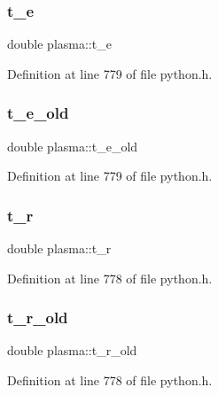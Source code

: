 \subsubsection{\texorpdfstring{t\+\_\+e}{t\_e}}
{\footnotesize\ttfamily double plasma\+::t\+\_\+e}



Definition at line 779 of file python.\+h.

\mbox{\label{structplasma_aefa8d272f5a54cae990359cccd67075d}} 
\subsubsection{\texorpdfstring{t\+\_\+e\+\_\+old}{t\_e\_old}}
{\footnotesize\ttfamily double plasma\+::t\+\_\+e\+\_\+old}



Definition at line 779 of file python.\+h.

\mbox{\label{structplasma_a432a1f85db9000aac743588736fb6048}} 
\subsubsection{\texorpdfstring{t\+\_\+r}{t\_r}}
{\footnotesize\ttfamily double plasma\+::t\+\_\+r}



Definition at line 778 of file python.\+h.

\mbox{\label{structplasma_af2b47aa340055b4dfc21f592a98f9792}} 
\subsubsection{\texorpdfstring{t\+\_\+r\+\_\+old}{t\_r\_old}}
{\footnotesize\ttfamily double plasma\+::t\+\_\+r\+\_\+old}



Definition at line 778 of file python.\+h.

\mbox{\label{structplasma_ae1ff443abf16813160cb9756d33f81d9}} 
